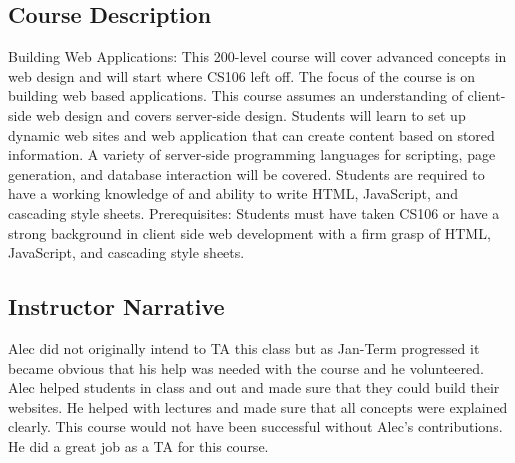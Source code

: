 
\subsection*{Course Description}
Building Web Applications: This 200-level course will cover advanced concepts
in web design and will start where CS106 left off. The focus of the course is
on building web based applications. This course assumes an understanding of
client-side web design and covers server-side design. Students will learn to
set up dynamic web sites and web application that can create content based on
stored information. A variety of server-side programming languages for
scripting, page generation, and database interaction will be covered. Students
are required to have a working knowledge of and ability to write HTML,
JavaScript, and cascading style sheets. Prerequisites: Students must have taken
CS106 or have a strong background in client side web development with a firm
grasp of HTML, JavaScript, and cascading style sheets. 

\subsection*{Instructor Narrative}
Alec did not originally intend to TA this class but as Jan-Term
progressed it became obvious that his help was needed with the course
and he volunteered. Alec helped students in class and out and made sure
that they could build their websites. He helped with lectures and made
sure that all concepts were explained clearly. This course would not
have been successful without Alec's contributions. He did a great job as
a TA for this course.
